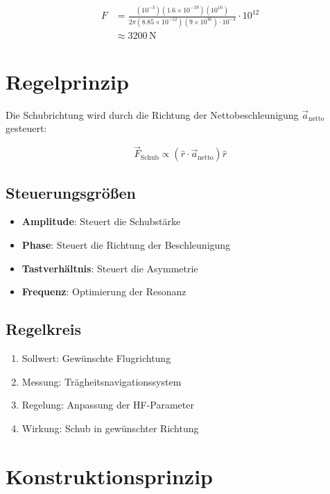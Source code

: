 \documentclass[11pt, a4paper]{article}
\begin{document}
\begin{align*}
F &= \frac{(10^{-3})(1.6 \times 10^{-19})(10^{16})}{2\pi (8.85 \times 10^{-12})(9 \times 10^{16}) \cdot 10^{-4}} \cdot 10^{12} \\
&\approx 3200\,\text{N}
\end{align*}

\section{Regelprinzip}

Die Schubrichtung wird durch die Richtung der Nettobeschleunigung $\vec{a}_{\text{netto}}$ gesteuert:

\begin{equation}
\vec{F}_{\text{Schub}} \propto (\hat{r} \cdot \vec{a}_{\text{netto}}) \hat{r}
\end{equation}

\subsection{Steuerungsgrößen}

\begin{itemize}
    \item \textbf{Amplitude}: Steuert die Schubstärke
    \item \textbf{Phase}: Steuert die Richtung der Beschleunigung
    \item \textbf{Tastverhältnis}: Steuert die Asymmetrie
    \item \textbf{Frequenz}: Optimierung der Resonanz
\end{itemize}

\subsection{Regelkreis}

\begin{enumerate}
    \item Sollwert: Gewünschte Flugrichtung
    \item Messung: Trägheitsnavigationssystem
    \item Regelung: Anpassung der HF-Parameter
    \item Wirkung: Schub in gewünschter Richtung
\end{enumerate}

\section{Konstruktionsprinzip}
\end{document}
